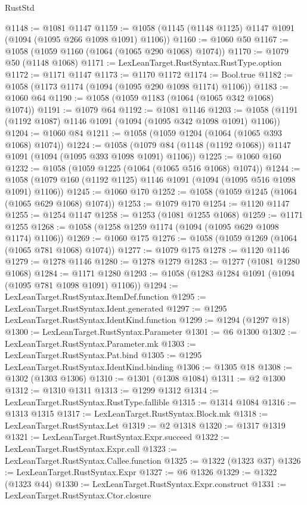 \begin{lexlean}{RustStd}
\begin{coremodule}
{\begin{coremodule}
{{{{{{{{{{{{{{{{{{{{{{{{{{{{{{{{{{{{{{@1148 := @1081 @1147
@1159 := @1058 (@1145 (@1148 @1125) @1147 @1091 (@1094 (@1095 @266 @1098 @1091) @1106))
@1160 := @1060 @50
@1167 := @1058 (@1059 @1160 (@1064 (@1065 @290 @1068) @1074))
@1170 := @1079 @50 (@1148 @1068)
@1171 := LexLeanTarget.RustSyntax.RustType.option
@1172 := @1171 @1147
@1173 := @1170 @1172
@1174 := Bool.true
@1182 := @1058 (@1173 @1174 (@1094 (@1095 @290 @1098 @1174) @1106))
@1183 := @1060 @64
@1190 := @1058 (@1059 @1183 (@1064 (@1065 @342 @1068) @1074))
@1191 := @1079 @64
@1192 := @1081 @1146
@1203 := @1058 (@1191 (@1192 @1087) @1146 @1091 (@1094 (@1095 @342 @1098 @1091) @1106))
@1204 := @1060 @84
@1211 := @1058 (@1059 @1204 (@1064 (@1065 @393 @1068) @1074))
@1224 := @1058 (@1079 @84 (@1148 (@1192 @1068)) @1147 @1091 (@1094 (@1095 @393 @1098 @1091) @1106))
@1225 := @1060 @160
@1232 := @1058 (@1059 @1225 (@1064 (@1065 @516 @1068) @1074))
@1244 := @1058 (@1079 @160 (@1192 @1125) @1146 @1091 (@1094 (@1095 @516 @1098 @1091) @1106))
@1245 := @1060 @170
@1252 := @1058 (@1059 @1245 (@1064 (@1065 @629 @1068) @1074))
@1253 := @1079 @170
@1254 := @1120 @1147
@1255 := @1254 @1147
@1258 := @1253 (@1081 @1255 @1068)
@1259 := @1171 @1255
@1268 := @1058 (@1258 @1259 @1174 (@1094 (@1095 @629 @1098 @1174) @1106))
@1269 := @1060 @175
@1276 := @1058 (@1059 @1269 (@1064 (@1065 @781 @1068) @1074))
@1277 := @1079 @175
@1278 := @1120 @1146
@1279 := @1278 @1146
@1280 := @1278 @1279
@1283 := @1277 (@1081 @1280 @1068)
@1284 := @1171 @1280
@1293 := @1058 (@1283 @1284 @1091 (@1094 (@1095 @781 @1098 @1091) @1106))
@1294 := LexLeanTarget.RustSyntax.ItemDef.function
@1295 := LexLeanTarget.RustSyntax.Ident.generated
@1297 := @1295 LexLeanTarget.RustSyntax.IdentKind.function
@1299 := @1294 (@1297 @18)
@1300 := LexLeanTarget.RustSyntax.Parameter
@1301 := @6 @1300
@1302 := LexLeanTarget.RustSyntax.Parameter.mk
@1303 := LexLeanTarget.RustSyntax.Pat.bind
@1305 := @1295 LexLeanTarget.RustSyntax.IdentKind.binding
@1306 := @1305 @18
@1308 := @1302 (@1303 @1306)
@1310 := @1301 (@1308 @1084)
@1311 := @2 @1300
@1312 := @1310 @1311
@1313 := @1299 @1312
@1314 := LexLeanTarget.RustSyntax.RustType.fallible
@1315 := @1314 @1084
@1316 := @1313 @1315
@1317 := LexLeanTarget.RustSyntax.Block.mk
@1318 := LexLeanTarget.RustSyntax.Let
@1319 := @2 @1318
@1320 := @1317 @1319
@1321 := LexLeanTarget.RustSyntax.Expr.succeed
@1322 := LexLeanTarget.RustSyntax.Expr.call
@1323 := LexLeanTarget.RustSyntax.Callee.function
@1325 := @1322 (@1323 @37)
@1326 := LexLeanTarget.RustSyntax.Expr
@1327 := @6 @1326
@1329 := @1322 (@1323 @44)
@1330 := LexLeanTarget.RustSyntax.Expr.construct
@1331 := LexLeanTarget.RustSyntax.Ctor.closure
}}}}}}}}}}}}}}}}}}}}}}}}}}}}}}}}}}}}}}
\end{coremodule}}
\end{coremodule}
\end{lexlean}
